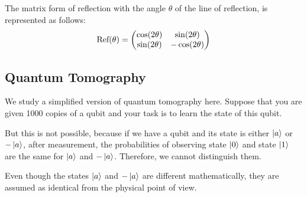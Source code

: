 The matrix form of reflection with the angle $\theta$ of the line of reflection, is represented as follows:
\begin{equation*}
\gate{Ref}(\theta)=\begin{pmatrix}
	                   \cos(2\theta) & \sin(2\theta) \\ \sin(2\theta) & -\cos(2\theta)
\end{pmatrix}
\end{equation*}

\subsection{Quantum Tomography}
We study a simplified version of quantum tomography here.
Suppose that you are given 1000 copies of a qubit and your task is to learn the state of this qubit.

But this is not possible, because if we have a qubit and its state is either $\ket{a}$ or $-\ket{a}$, after measurement, the probabilities of observing state $\ket{0}$ and state $\ket{1}$ are the same for $\ket{a}$ and $-\ket{a}$.
Therefore, we cannot distinguish them.

Even though the states $\ket{a}$ and $-\ket{a}$ are different mathematically, they are assumed as identical from the physical point of view.